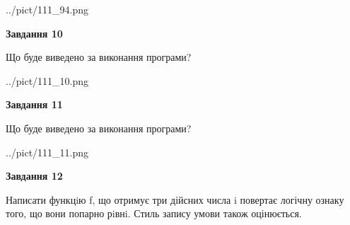 \documentclass[12pt, ukrainian]{article}
\begin{document}
{\begin {large}
\begin{center}
	{../pict/111_94.png}
\end{center}
\newpage

{\begin {center}\textbf{Завдання 10}\end {center}}

Що буде виведено за виконання програми?\par
\begin{center}
	{../pict/111_10.png}
\end{center}
\newpage

{\begin {center}\textbf{Завдання 11}\end {center}}

Що буде виведено за виконання програми?\par
\begin{center}
	{../pict/111_11.png}
\end{center}
\newpage

{\begin {center}\textbf{Завдання 12}\end {center}}


Написати функцiю f, що отримує три дійсних числа i повертає логічну ознаку того, що вони попарно рiвнi. Стиль запису умови також оцінюється.\par
\newpage

\end {large}}
\end{document}

